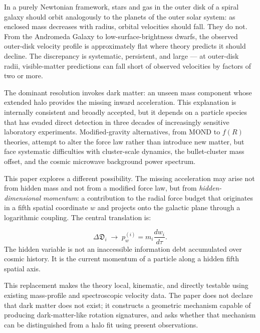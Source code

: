 \documentclass[11pt,a4paper]{article}
\newcommand{\pw}{p_w}                        %
\newcommand{\InfoD}{\Delta\mathfrak{D}}      %
\begin{document}
In a purely Newtonian framework, stars and gas in the outer disk of a spiral
galaxy should orbit analogously to the planets of the outer solar system: as
enclosed mass decreases with radius, orbital velocities should fall.  They do
not.  From the Andromeda Galaxy to low-surface-brightness dwarfs, the observed
outer-disk velocity profile is approximately flat where theory predicts it
should decline.  The discrepancy is systematic, persistent, and large --- at
outer-disk radii, visible-matter predictions can fall short of observed
velocities by factors of two or more.

The dominant resolution invokes dark matter: an unseen mass component whose
extended halo provides the missing inward acceleration.  This explanation is
internally consistent and broadly accepted, but it depends on a particle species
that has evaded direct detection in three decades of increasingly sensitive
laboratory experiments.  Modified-gravity alternatives, from MOND to $f(R)$
theories, attempt to alter the force law rather than introduce new matter,
but face systematic difficulties with cluster-scale dynamics, the bullet-cluster
mass offset, and the cosmic microwave background power spectrum.

This paper explores a different possibility.  The missing acceleration may arise
not from hidden mass and not from a modified force law, but from
\emph{hidden-dimensional momentum}: a contribution to the radial force budget
that originates in a fifth spatial coordinate $w$ and projects onto the galactic
plane through a logarithmic coupling.  The central translation is:

\begin{keybox}
\[
  \InfoD_i \;\longrightarrow\; \pw^{(i)} = m_i \frac{dw_i}{d\tau} .
\]
The hidden variable is not an inaccessible information debt accumulated over
cosmic history.  It is the current momentum of a particle along a hidden fifth
spatial axis.
\end{keybox}

\noindent
This replacement makes the theory local, kinematic, and directly testable using
existing mass-profile and spectroscopic velocity data.  The paper does not
declare that dark matter does not exist; it constructs a geometric mechanism
capable of producing dark-matter-like rotation signatures, and asks whether
that mechanism can be distinguished from a halo fit using present observations.
\end{document}
